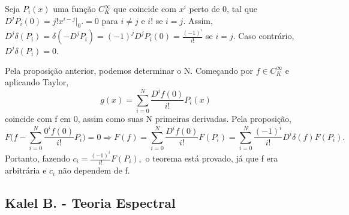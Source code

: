 \documentclass[measure_theory.tex]{subfiles}
\begin{document}
\begin{proof*}
	Seja \(P_{i}(x)\) uma função \(C_{K}^{\infty}\) que coincide com \(x^{i}\) perto de 0, tal que \(D^{j}P_{i}(0) = j!x^{i-j}\biggl|_{0}^{}\biggr. =0\) para \(i\neq j\) e \(i!\) se \(i= j\). Assim,
	\(D^{j}\delta (P_{i}) = \delta (-D^{j}P_{i}) = (-1)^{j}D^{j}P_{i}(0) = \frac{(-1)^{i}}{i!}\) se \(i = j\). Caso contrário, \(D^{j}\delta (P_{i}) = 0.\)

	Pela proposição anterior, podemos determinar o N. Começando por \(f\in C_{K}^{\infty}\) e aplicando Taylor,
	\[
		g(x) = \sum\limits_{i=0}^{N}\frac{D^{i}f(0)}{i!}P_{i}(x)
	\]
	coincide com f em 0, assim como suas N primeiras derivadas. Pela proposição,
	\[
		F \biggl(f - \sum\limits_{i=0}^{N}\frac{0^{i}f(0)}{i!}P_{i}\biggr) = 0 \Rightarrow F(f) = \sum\limits_{i=0}^{N}\frac{D^{i}f(0)}{i!}F(P_{i}) = \sum\limits_{i=0}^{N} \frac{(-1)^{i}}{i!}D^{i}\delta (f)F(P_{i}).
	\]
	Portanto, fazendo \(c_{i} = \frac{(-1)^{i}}{i!}F(P_{i}),\) o teorema está provado, já que f era arbitrária e \(c_{i}\) não dependem de f. \qedsymbol
\end{proof*}

\subsection{Kalel B. - Teoria Espectral}
\end{document}
